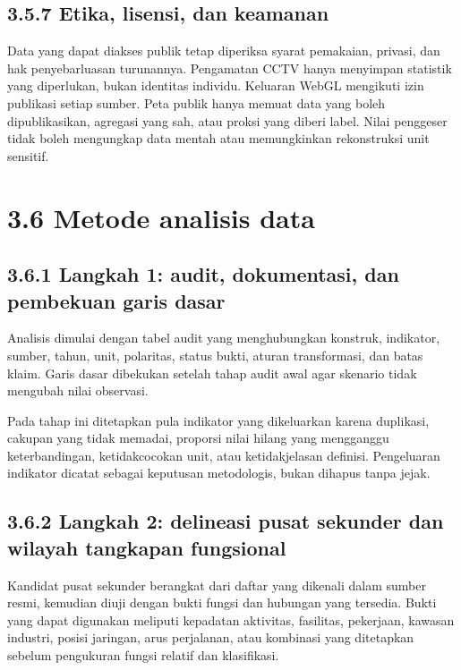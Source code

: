 \documentclass[
  indonesian,
  11pt,
  a4paper,
  oneside,
  openany]{report}
\begin{document}
\subsection{3.5.7 Etika, lisensi, dan
keamanan}\label{etika-lisensi-dan-keamanan}

Data yang dapat diakses publik tetap diperiksa syarat pemakaian,
privasi, dan hak penyebarluasan turunannya. Pengamatan CCTV hanya
menyimpan statistik yang diperlukan, bukan identitas individu. Keluaran
WebGL mengikuti izin publikasi setiap sumber. Peta publik hanya memuat
data yang boleh dipublikasikan, agregasi yang sah, atau proksi yang
diberi label. Nilai penggeser tidak boleh mengungkap data mentah atau
memungkinkan rekonstruksi unit sensitif.

\section{3.6 Metode analisis data}\label{metode-analisis-data}

\subsection{3.6.1 Langkah 1: audit, dokumentasi, dan pembekuan garis
dasar}\label{langkah-1-audit-dokumentasi-dan-pembekuan-garis-dasar}

Analisis dimulai dengan tabel audit yang menghubungkan konstruk,
indikator, sumber, tahun, unit, polaritas, status bukti, aturan
transformasi, dan batas klaim. Garis dasar dibekukan setelah tahap audit
awal agar skenario tidak mengubah nilai observasi.

Pada tahap ini ditetapkan pula indikator yang dikeluarkan karena
duplikasi, cakupan yang tidak memadai, proporsi nilai hilang yang
mengganggu keterbandingan, ketidakcocokan unit, atau ketidakjelasan
definisi. Pengeluaran indikator dicatat sebagai keputusan metodologis,
bukan dihapus tanpa jejak.

\subsection{3.6.2 Langkah 2: delineasi pusat sekunder dan wilayah
tangkapan
fungsional}\label{langkah-2-delineasi-pusat-sekunder-dan-wilayah-tangkapan-fungsional}

Kandidat pusat sekunder berangkat dari daftar yang dikenali dalam sumber
resmi, kemudian diuji dengan bukti fungsi dan hubungan yang tersedia.
Bukti yang dapat digunakan meliputi kepadatan aktivitas, fasilitas,
pekerjaan, kawasan industri, posisi jaringan, arus perjalanan, atau
kombinasi yang ditetapkan sebelum pengukuran fungsi relatif dan
klasifikasi.
\end{document}
